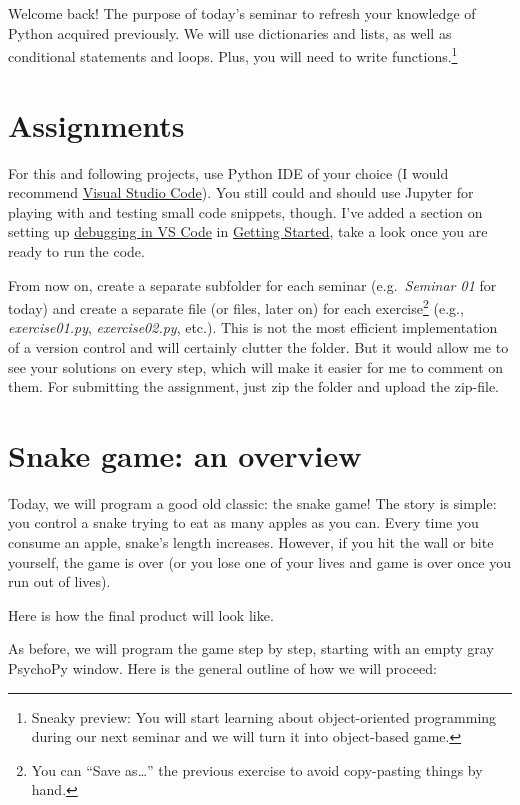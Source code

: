 \documentclass[
]{book}
\begin{document}
Welcome back! The purpose of today's seminar to refresh your knowledge of Python acquired previously. We will use dictionaries and lists, as well as conditional statements and loops. Plus, you will need to write functions.\footnote{Sneaky preview: You will start learning about object-oriented programming during our next seminar and we will turn it into object-based game.}

\hypertarget{assignments}{%
\section{Assignments}\label{assignments}}

For this and following projects, use Python IDE of your choice (I would recommend \protect\hyperlink{install-vs-code}{Visual Studio Code}). You still could and should use Jupyter for playing with and testing small code snippets, though. I've added a section on setting up \protect\hyperlink{debug-in-vs-code}{debugging in VS Code} in \protect\hyperlink{getting-started}{Getting Started}, take a look once you are ready to run the code.

From now on, create a separate subfolder for each seminar (e.g.~\emph{Seminar 01} for today) and create a separate file (or files, later on) for each exercise\footnote{You can ``Save as\ldots{}'' the previous exercise to avoid copy-pasting things by hand.} (e.g., \emph{exercise01.py}, \emph{exercise02.py}, etc.). This is not the most efficient implementation of a version control and will certainly clutter the folder. But it would allow me to see your solutions on every step, which will make it easier for me to comment on them. For submitting the assignment, just zip the folder and upload the zip-file.

\hypertarget{snake-game-an-overview}{%
\section{Snake game: an overview}\label{snake-game-an-overview}}

Today, we will program a good old classic: the snake game! The story is simple: you control a snake trying to eat as many apples as you can. Every time you consume an apple, snake's length increases. However, if you hit the wall or bite yourself, the game is over (or you lose one of your lives and game is over once you run out of lives).

Here is how the final product will look like.

As before, we will program the game step by step, starting with an empty gray PsychoPy window. Here is the general outline of how we will proceed:
\end{document}
